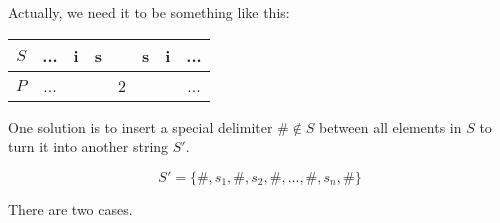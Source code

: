 \documentclass[b5paper]{article}
\begin{document}
Actually, we need it to be something like this:

\begin{tabular}{|c|c|c|c|c|c|c|c|}
\hline
$S$ & ... & i & s &   & s & i & ... \\
\hline
$P$ & ... &   &   & 2 &   &   & ... \\
\hline
\end{tabular}

One solution is to insert a special delimiter $\# \notin S$ between all elements in $S$ to
turn it into another string $S'$.

\begin{equation}
S' = \{\#, s_1, \#, s_2, \#, ..., \#, s_n, \#\}
\end{equation}

There are two cases.
\end{document}
